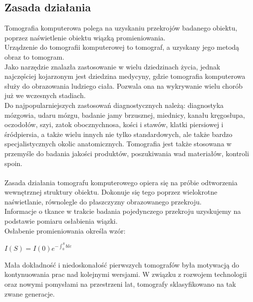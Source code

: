 \documentclass[A_4paper,12pt]{article}
\begin{document}
\subsection{Zasada działania}
Tomografia komputerowa polega na uzyskaniu przekrojów badanego obiektu, poprzez naświetlenie obiektu wiązką promieniowania. \\
Urządzenie do tomografii komputerowej to tomograf, a uzyskany jego metodą obraz to tomogram. \\
Jako narzędzie znalazła zastosowanie w wielu dziedzinach życia, jednak najczęściej kojarzonym jest dziedzina medycyny, gdzie tomografia komputerowa służy do obrazowania ludziego ciała. Pozwala ona na wykrywanie wielu chorób już we wczesnych stadiach. \\
Do najpopularniejszych zastosowań diagnostycznych należą: diagnostyka mózgowia, udaru mózgu, badanie jamy brzusznej, miednicy, kanału kręgosłupa, oczodołów, szyi, zatok obocznychnosa, kości i stawów, klatki piersiowej i śródpiersia, a także wielu innych nie tylko standardowych, ale także bardzo specjalistycznych okolic anatomicznych.
Tomografia jest także stosowana w przemyśle do badania jakości produktów, poszukiwania wad materiałów, kontroli spoin.
\\ \\
Zasada działania tomografu komputerowego opiera się na próbie odtworzenia wewnętrznej struktury obiektu.
Dokonuje się tego poprzez wielokrotne naświetlanie, równolegle do płaszczyzny obrazowanego przekroju. \\
Informacje o tkance w trakcie badania pojedynczego przekroju uzyskujemy na podstawie pomiaru osłabienia wiązki. \\
Osłabenie promieniowania określa wzór: \\
\begin{center}
$I(S) = I(0) e^{-\int_0^S{ble}}$
\end{center}

Mała dokładność i niedoskonałość pierwszych tomografów była motywacją do kontynuowania prac nad kolejnymi wersjami.
W związku z rozwojem technologii oraz nowymi pomysłami na przestrzeni lat, tomografy sklasyfikowano na tak zwane generacje.
\end{document}
